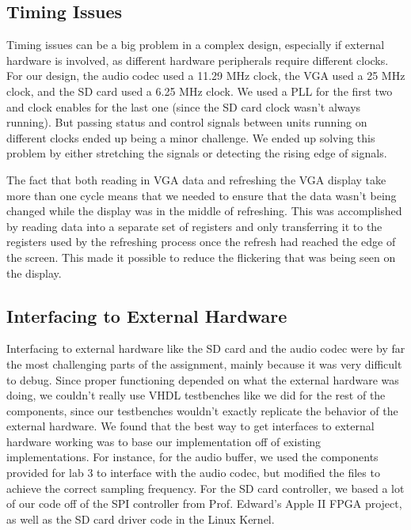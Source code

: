 \documentclass{article}
\begin{document}
\subsection{Timing Issues}

Timing issues can be a big problem in a complex design, especially if external 
hardware is involved, as different hardware peripherals require different clocks. 
For our design, the audio codec used a 11.29 MHz clock, the VGA used a 25 MHz 
clock, and the SD card used a 6.25 MHz clock. We used a PLL for the first two 
and clock enables for the last one (since the SD card clock wasn’t always running). 
But passing status and control signals between units running on different clocks 
ended up being a minor challenge. We ended up solving this problem by either 
stretching the signals or detecting the rising edge of signals.

The fact that both reading in VGA data and refreshing the VGA display take more 
than one cycle means that we needed to ensure that the data wasn’t being changed 
while the display was in the middle of refreshing. This was accomplished by 
reading data into a separate set of registers and only transferring it to the 
registers used by the refreshing process once the refresh had reached the edge 
of the screen.  This made it possible to reduce the flickering that was being 
seen on the display.

\subsection{Interfacing to External Hardware}

Interfacing to external hardware like the SD card and the audio codec were by 
far the most challenging parts of the assignment, mainly because it was very 
difficult to debug. Since proper functioning depended on what the external 
hardware was doing, we couldn’t really use VHDL testbenches like we did for 
the rest of the components, since our testbenches wouldn’t exactly replicate 
the behavior of the external hardware. We found that the best way to get 
interfaces to external hardware working was to base our implementation off of 
existing implementations. For instance, for the audio buffer, we used the 
components provided for lab 3 to interface with the audio codec, but modified 
the files to achieve the correct sampling frequency. For the SD card controller, 
we based a lot of our code off of the SPI controller from Prof. Edward’s Apple 
II FPGA project, as well as the SD card driver code in the Linux Kernel. 
\end{document}
